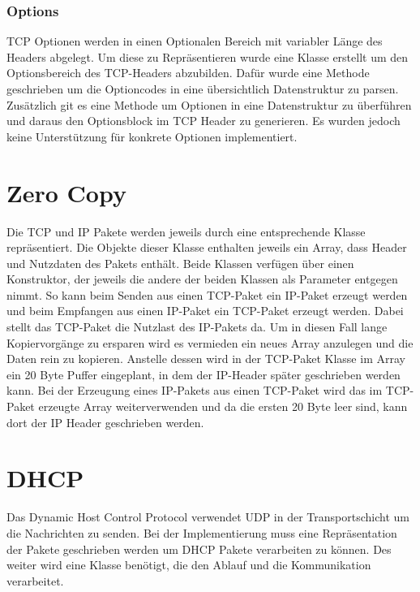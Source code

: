 \subsubsection{Options}
TCP Optionen werden in einen Optionalen Bereich mit variabler Länge des Headers abgelegt. Um diese zu Repräsentieren wurde eine Klasse erstellt um den Optionsbereich des TCP-Headers abzubilden. Dafür wurde eine Methode geschrieben um die Optioncodes in eine übersichtlich Datenstruktur zu parsen. Zusätzlich git es eine Methode um Optionen in eine Datenstruktur zu überführen und daraus den Optionsblock im TCP Header zu generieren. Es wurden jedoch keine Unterstützung für konkrete Optionen implementiert.



\section{Zero Copy}
Die TCP und IP Pakete werden jeweils durch eine entsprechende Klasse repräsentiert. Die Objekte dieser Klasse enthalten jeweils ein Array, dass Header und Nutzdaten des Pakets enthält. Beide Klassen verfügen über einen Konstruktor, der jeweils die andere der beiden Klassen als Parameter entgegen nimmt. So kann beim Senden aus einen TCP-Paket ein IP-Paket erzeugt werden und beim Empfangen aus einen IP-Paket ein TCP-Paket erzeugt werden. Dabei stellt das TCP-Paket die Nutzlast des IP-Pakets da. Um in diesen Fall lange Kopiervorgänge zu ersparen wird es vermieden ein neues Array anzulegen und die Daten rein zu kopieren. Anstelle dessen wird in der TCP-Paket Klasse im Array ein 20 Byte Puffer eingeplant, in dem der IP-Header später geschrieben werden kann. Bei der Erzeugung eines IP-Pakets aus einen TCP-Paket wird das im TCP-Paket erzeugte Array weiterverwenden und da die ersten 20 Byte leer sind, kann dort der IP Header geschrieben werden.


\section{DHCP}
Das Dynamic Host Control Protocol verwendet UDP in der Transportschicht um die Nachrichten zu senden. Bei der Implementierung muss eine Repräsentation der Pakete geschrieben werden um DHCP Pakete verarbeiten zu können. Des weiter wird eine Klasse benötigt, die den Ablauf und die Kommunikation verarbeitet. 

